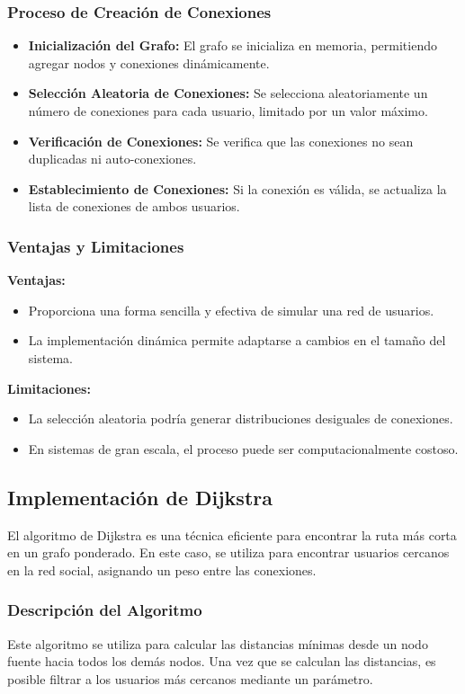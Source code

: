 \documentclass[9pt,letterpaper,onecolumn]{rho-class/rho}
\begin{document}
\subsubsection{Proceso de Creación de Conexiones}
\begin{itemize}
	\item \textbf{Inicialización del Grafo:} El grafo se inicializa en memoria, permitiendo agregar nodos y conexiones dinámicamente.
	\item \textbf{Selección Aleatoria de Conexiones:} Se selecciona aleatoriamente un número de conexiones para cada usuario, limitado por un valor máximo.
	\item \textbf{Verificación de Conexiones:} Se verifica que las conexiones no sean duplicadas ni auto-conexiones.
	\item \textbf{Establecimiento de Conexiones:} Si la conexión es válida, se actualiza la lista de conexiones de ambos usuarios.
\end{itemize}

\subsubsection{Ventajas y Limitaciones}
\textbf{Ventajas:}
\begin{itemize}
	\item Proporciona una forma sencilla y efectiva de simular una red de usuarios.
	\item La implementación dinámica permite adaptarse a cambios en el tamaño del sistema.
\end{itemize}
\textbf{Limitaciones:}
\begin{itemize}
	\item La selección aleatoria podría generar distribuciones desiguales de conexiones.
	\item En sistemas de gran escala, el proceso puede ser computacionalmente costoso.
\end{itemize}

\subsection{Implementación de Dijkstra}
El algoritmo de Dijkstra es una técnica eficiente para encontrar la ruta más corta en un grafo ponderado.
En este caso, se utiliza para encontrar usuarios cercanos en la red social, asignando un peso entre las conexiones. 

\subsubsection{Descripción del Algoritmo}
Este algoritmo se utiliza para calcular las distancias mínimas desde un nodo fuente hacia todos los demás nodos. 
Una vez que se calculan las distancias, es posible filtrar a los usuarios más cercanos mediante un parámetro.
\end{document}
